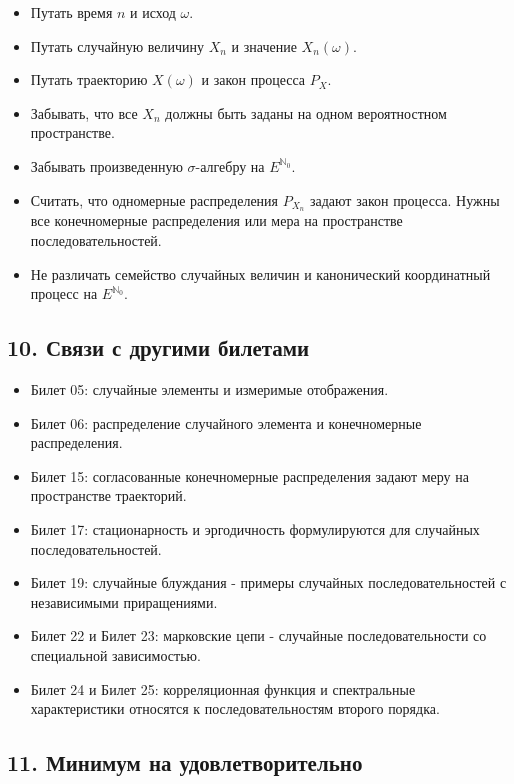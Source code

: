 \documentclass[
  11pt,
  a4paper,
]{article}
\providecommand{\tightlist}{%
  \setlength{\itemsep}{0pt}\setlength{\parskip}{0pt}}
\begin{document}
\begin{itemize}
\tightlist
\item
  Путать время \(n\) и исход \(\omega\).
\item
  Путать случайную величину \(X_n\) и значение \(X_n(\omega)\).
\item
  Путать траекторию \(X(\omega)\) и закон процесса \(P_X\).
\item
  Забывать, что все \(X_n\) должны быть заданы на одном вероятностном
  пространстве.
\item
  Забывать произведенную \(\sigma\)-алгебру на \(E^{\mathbb N_0}\).
\item
  Считать, что одномерные распределения \(P_{X_n}\) задают закон
  процесса. Нужны все конечномерные распределения или мера на
  пространстве последовательностей.
\item
  Не различать семейство случайных величин и канонический координатный
  процесс на \(E^{\mathbb N_0}\).
\end{itemize}

\subsection{10. Связи с другими
билетами}\label{ux441ux432ux44fux437ux438-ux441-ux434ux440ux443ux433ux438ux43cux438-ux431ux438ux43bux435ux442ux430ux43cux438}

\begin{itemize}
\tightlist
\item
  Билет 05: случайные элементы и измеримые отображения.
\item
  Билет 06: распределение случайного элемента и конечномерные
  распределения.
\item
  Билет 15: согласованные конечномерные распределения задают меру на
  пространстве траекторий.
\item
  Билет 17: стационарность и эргодичность формулируются для случайных
  последовательностей.
\item
  Билет 19: случайные блуждания - примеры случайных последовательностей
  с независимыми приращениями.
\item
  Билет 22 и Билет 23: марковские цепи - случайные последовательности со
  специальной зависимостью.
\item
  Билет 24 и Билет 25: корреляционная функция и спектральные
  характеристики относятся к последовательностям второго порядка.
\end{itemize}

\subsection{11. Минимум на
удовлетворительно}\label{ux43cux438ux43dux438ux43cux443ux43c-ux43dux430-ux443ux434ux43eux432ux43bux435ux442ux432ux43eux440ux438ux442ux435ux43bux44cux43dux43e}
\end{document}

